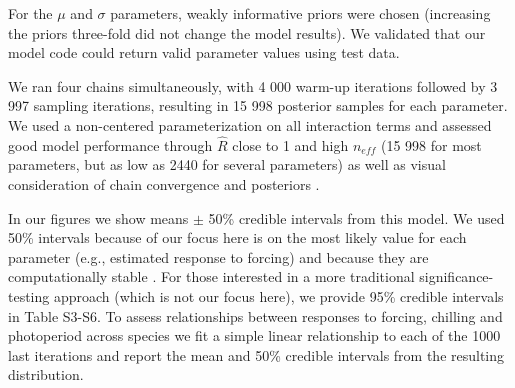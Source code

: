 \documentclass[11pt]{article}
\begin{document}
\noindent For the $\mu$ and $\sigma$ parameters, weakly informative priors were chosen (increasing the priors three-fold did not change the model results). We validated that our model code could return valid parameter values using test data. 

We ran four chains simultaneously, with 4 000 warm-up iterations followed by 3 997 sampling iterations, resulting in 15 998 posterior samples for each parameter. We used a non-centered parameterization on all interaction terms and assessed good model performance through $\hat{R}$ close to 1 and high $n_{eff}$ (15 998 for most parameters, but as low as 2440 for several parameters) as well as visual consideration of chain convergence and posteriors \citep{BDA}. 

In our figures we show means $\pm$ 50\% credible intervals from this model. We used 50\% intervals because of our focus here is on the most likely value for each parameter (e.g., estimated response to forcing) and because they are computationally stable \citep{BDA,Carpenter:2016aa}. For those interested in a more traditional significance-testing approach (which is not our focus here), we provide 95\% credible intervals in Table S3-S6. To assess relationships between responses to forcing, chilling and photoperiod across species we fit a simple linear relationship to each of the 1000 last iterations and report the mean and 50\% credible intervals from the resulting distribution.


\end{document}
